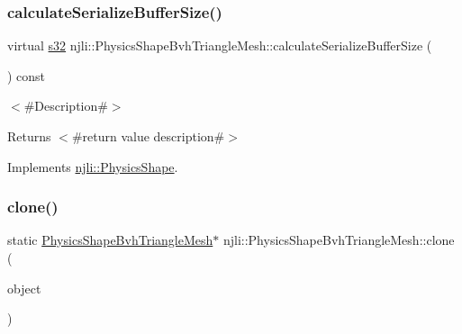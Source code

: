 \mbox{\label{classnjli_1_1_physics_shape_bvh_triangle_mesh_a04d31d1728e5c858f3e5c91f00933d1d}} 
\subsubsection{\texorpdfstring{calculate\+Serialize\+Buffer\+Size()}{calculateSerializeBufferSize()}}
{\footnotesize\ttfamily virtual \mbox{\hyperlink{_util_8h_aa62c75d314a0d1f37f79c4b73b2292e2}{s32}} njli\+::\+Physics\+Shape\+Bvh\+Triangle\+Mesh\+::calculate\+Serialize\+Buffer\+Size (\begin{DoxyParamCaption}{ }\end{DoxyParamCaption}) const\hspace{0.3cm}{\ttfamily [virtual]}}

$<$\#\+Description\#$>$

\begin{DoxyReturn}{Returns}
$<$\#return value description\#$>$ 
\end{DoxyReturn}


Implements \mbox{\hyperlink{classnjli_1_1_physics_shape_a0612a1c8c3f4520d78cb7f5838f03074}{njli\+::\+Physics\+Shape}}.

\mbox{\label{classnjli_1_1_physics_shape_bvh_triangle_mesh_a6d84eee4990aa600cca8a278e55610b2}} 
\subsubsection{\texorpdfstring{clone()}{clone()}}
{\footnotesize\ttfamily static \mbox{\hyperlink{classnjli_1_1_physics_shape_bvh_triangle_mesh}{Physics\+Shape\+Bvh\+Triangle\+Mesh}}$\ast$ njli\+::\+Physics\+Shape\+Bvh\+Triangle\+Mesh\+::clone (\begin{DoxyParamCaption}\item[{const \mbox{\hyperlink{classnjli_1_1_physics_shape_bvh_triangle_mesh}{Physics\+Shape\+Bvh\+Triangle\+Mesh}} \&}]{object }\end{DoxyParamCaption})\hspace{0.3cm}{\ttfamily [static]}}

